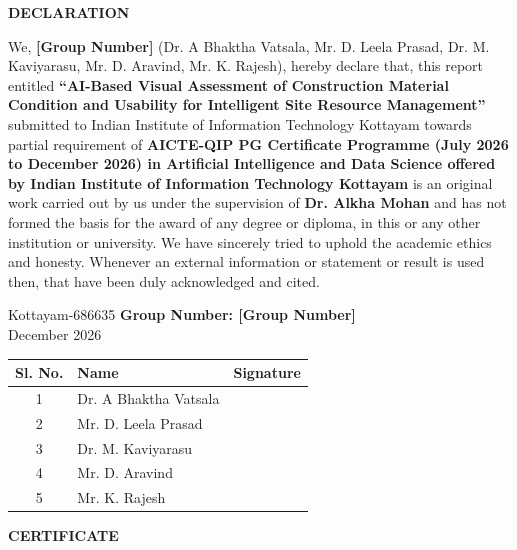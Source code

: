 \documentclass[12pt,a4paper]{report}
\theoremstyle{definition}
\begin{document}
\newpage

\begin{center}
    {\Large \textbf{DECLARATION}} \par
\end{center}
\vspace{1.0cm}

We, \textbf{[Group Number]} (Dr. A Bhaktha Vatsala, Mr. D. Leela Prasad, Dr. M. Kaviyarasu, Mr. D. Aravind, Mr. K. Rajesh), hereby declare that, this report entitled \textbf{“AI-Based Visual Assessment of Construction Material Condition and Usability for Intelligent Site Resource Management”} submitted to Indian Institute of Information Technology Kottayam towards partial requirement of \textbf{AICTE-QIP PG Certificate Programme (July 2026 to December 2026) in Artificial Intelligence and Data Science offered by Indian Institute of Information Technology Kottayam} is an original work carried out by us under the supervision of \textbf{Dr. Alkha Mohan} and has not formed the basis for the award of any degree or diploma, in this or any other institution or university. We have sincerely tried to uphold the academic ethics and honesty. Whenever an external information or statement or result is used then, that have been duly acknowledged and cited.

\vspace{1.5cm}
\noindent Kottayam-686635 \hfill \textbf{Group Number: [Group Number]} \\
December 2026

\vspace{0.8cm}
\noindent
\begin{tabular}{|c|p{7cm}|p{5cm}|}
\hline
\textbf{Sl. No.} & \textbf{Name} & \textbf{Signature} \\ \hline
1 & Dr. A Bhaktha Vatsala & \\ \hline
2 & Mr. D. Leela Prasad & \\ \hline
3 & Dr. M. Kaviyarasu & \\ \hline
4 & Mr. D. Aravind & \\ \hline
5 & Mr. K. Rajesh & \\ \hline
\end{tabular}

\newpage

\begin{center}
    {\Large \textbf{CERTIFICATE}} \par
\end{center}
\vspace{1.0cm}
\end{document}
